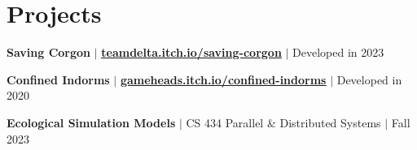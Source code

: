 \section{Projects}
    \resumeSubHeadingListStart







        \resumeProjectHeading
            {\textbf{Saving Corgon} $|$ \underline{\href{https://teamdelta.itch.io/saving-corgon}{\textbf{teamdelta.itch.io/saving-corgon}}} $|$ Developed in 2023}

        \resumeProjectHeading
            {\textbf{Confined Indorms} $|$ \underline{\href{https://gameheads.itch.io/confined-indorms}{\textbf{gameheads.itch.io/confined-indorms}}} $|$ Developed in 2020}

            \resumeItemListStart
            \resumeItemListEnd
        \resumeProjectHeading
            {\textbf{Ecological Simulation Models} $|$ CS 434 Parallel \& Distributed Systems $|$ Fall 2023}

